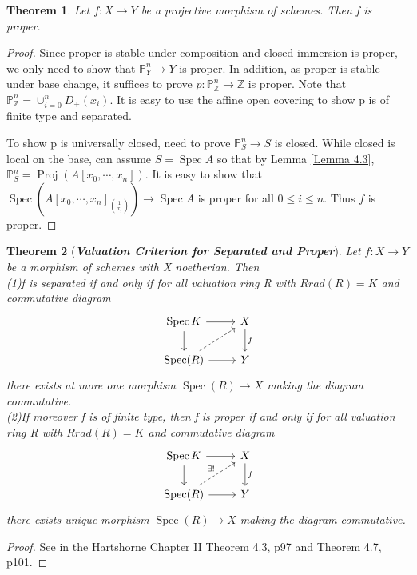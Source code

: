 \documentclass{ctexart}
\newtheorem{theorem}{Theorem}[section]
\newcommand{\spec}{\operatorname{Spec}}
\newcommand{\proj}{\operatorname{Proj}}
\begin{document}
\begin{theorem}
    Let $f: X \longrightarrow Y$ be a projective morphism of schemes.
    Then f is proper.
    \label{Theorem 4.3}
\end{theorem}
\begin{proof}
    Since proper is stable under composition and closed immersion is proper, we only need to show that $\mathbb{P}_{Y}^{n} \longrightarrow Y$ is proper.
    In addition, as proper is stable under base change, it suffices to prove $p: \mathbb{P}_{\mathbb{Z}}^{n} \longrightarrow \mathbb{Z}$ is proper.
    Note that $\mathbb{P}_{\mathbb{Z}}^{n} = \cup_{i = 0}^{n} D_{+}(x_{i})$.
    It is easy to use the affine open covering to show p is of finite type and separated.
    \par
    To show p is universally closed, need to prove $\mathbb{P}_{S}^{n} \longrightarrow S$ is closed.
    While closed is local on the base, can assume $S = \spec A$ so that by Lemma \ref{Lemma 4.3}, $\mathbb{P}_{S}^{n} = \proj(A[x_{0}, \cdots, x_{n}])$.
    It is easy to show that $\spec(A[x_{0}, \cdots, x_{n}]_{(\frac{1}{x_{i}})}) \longrightarrow \spec A$ is proper for all $0 \le i \le n$.
    Thus $f$ is proper.
\end{proof}
\begin{theorem}[\textbf{\emph{Valuation Criterion for Separated and Proper}}]
    Let $f: X \longrightarrow Y$ be a morphism of schemes with X noetherian.
    Then \\
    (1)f is separated if and only if for all valuation ring R with $Rrad(R) = K$ and commutative diagram
    \begin{equation*}
        \begin{tikzcd}
            \spec K \arrow[r] \arrow[d] &
            X \arrow[d, "f"] \\
            \spec(R) \arrow[ur, dashrightarrow] \arrow[r] &
            Y
        \end{tikzcd}
    \end{equation*}
    there exists at more one morphism $\spec(R) \longrightarrow X$ making the diagram commutative. \\
    (2)If moreover f is of finite type,
    then f is proper if and only if for all valuation ring R with $Rrad(R) = K$ and commutative diagram
    \begin{equation*}
        \begin{tikzcd}
            \spec K \arrow[r] \arrow[d] &
            X \arrow[d, "f"] \\
            \spec(R) \arrow[ur, "\exists!", dashrightarrow] \arrow[r] &
            Y
        \end{tikzcd}
    \end{equation*}
    there exists unique morphism $\spec(R) \longrightarrow X$ making the diagram commutative.
    \label{Theorem 4.4}
\end{theorem}
\begin{proof}
    See in the Hartshorne Chapter II Theorem 4.3, p97 and Theorem 4.7, p101.
\end{proof}
\end{document}
